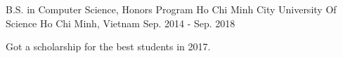 \begin{cventries} %
  \cventry
    {B.S. in Computer Science, Honors Program} %
    {Ho Chi Minh City University Of Science} %
    {Ho Chi Minh, Vietnam} %
    {Sep. 2014 - Sep. 2018} %
    {
      \begin{cvitems} %
        \item {Got a scholarship for the best students in 2017.}
      \end{cvitems}
    }

\end{cventries}
